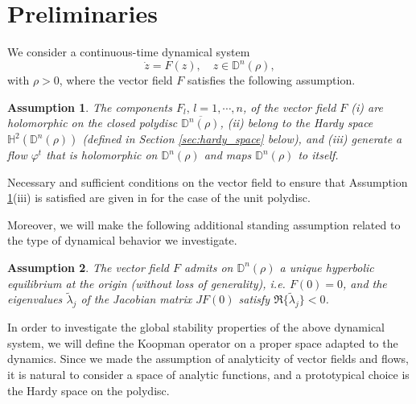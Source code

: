 \documentclass{article}
\newtheorem{assumption}{Assumption}
\begin{document}
\section{Preliminaries}
\label{sec:prelim}

We consider a continuous-time dynamical system
\begin{equation}\label{eq:systnon}
\dot{z} = F(z), \quad z\in \mathbb{D}^n(\rho), 
\end{equation}
with $\rho>0$, where the vector field $F$ satisfies the following assumption.
\begin{assumption}\label{assump4}
The components $F_l,\, l=1,\cdots, n$, of the vector field $F$ (i) are holomorphic on the closed polydisc $\overline{ \mathbb{D}^n(\rho)}$, (ii) belong to the Hardy space $\mathbb{H}^2(\mathbb{D}^n(\rho))$ (defined in Section \ref{sec:hardy_space} below), and %
(iii) generate a flow $\varphi^t$ that is holomorphic on $\mathbb{D}^n(\rho)$ and maps $\mathbb{D}^n(\rho)$ to itself.
\end{assumption}
\smallskip
Necessary and sufficient conditions on the vector field to ensure that Assumption \ref{assump4}(iii) is satisfied are given in \cite{RYCZHZ} for the case of the unit polydisc.

Moreover, we will make the following additional standing assumption related to the type of dynamical behavior we investigate.
\begin{assumption}
\label{assump_hyperbolic}
The vector field $F$ admits on $\mathbb{D}^n(\rho)$ a unique hyperbolic equilibrium at the origin (without loss of generality), i.e. $F(0)=0$, and the eigenvalues $\tilde{\lambda}_j$ of the Jacobian matrix $JF(0)$ satisfy $\Re\{\tilde{\lambda}_j\}<0$.
\end{assumption}

In order to investigate the global stability properties of the above dynamical system, we will define the Koopman operator on a proper space adapted to the dynamics. Since we made the assumption of analyticity of vector fields and flows, it is natural to consider a space of analytic functions, and a prototypical choice is the Hardy space on the polydisc.
\end{document}
